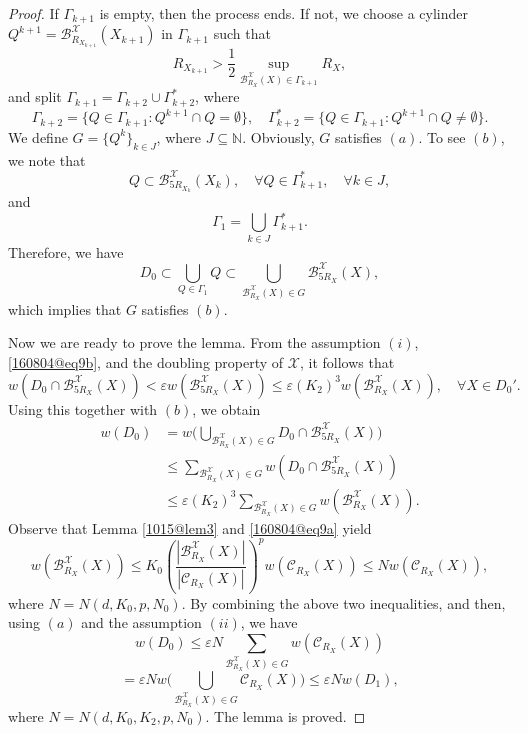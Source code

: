 \documentclass[reqno]{amsart}
\numberwithin{equation}{section}
\theoremstyle{plain}
\theoremstyle{definition}
\theoremstyle{remark}
\begin{document}
\begin{proof}
If $\Gamma_{k+1}$ is empty, then the process ends.
If not,  we choose a cylinder $Q^{k+1}={\mathcal{B}}^{\mathcal{X}}_{R_{X_{k+1}}}(X_{k+1})$ in $\Gamma_{k+1}$ such that 
$$
R_{X_{k+1}}>\frac{1}{2}\sup_{{\mathcal{B}}_{R_X}^{\mathcal{X}}(X)\in \Gamma_{k+1}}R_X,
$$
and split $\Gamma_{k+1}=\Gamma_{k+2}\cup \Gamma_{k+2}^*$, where
$$
\Gamma_{k+2}=\{Q\in \Gamma_{k+1}: Q^{k+1}\cap Q=\emptyset\}, \quad \Gamma_{k+2}^*=\{Q\in \Gamma_{k+1}:Q^{k+1}\cap Q\neq \emptyset\}.
$$
We define $G=\{Q^k\}_{k\in J}$, where $J\subseteq {\mathbb{N}}$.
Obviously, $G$ satisfies $(a)$.
To see $(b)$, we note that 
$$
Q\subset {\mathcal{B}}^{\mathcal{X}}_{5R_{X_{k}}}(X_k), \quad \forall Q\in \Gamma_{k+1}^*, \quad \forall k\in J,
$$
and 
$$
\Gamma_1=\bigcup_{k\in J}\Gamma_{k+1}^*.
$$
Therefore, we have 
$$
D_0\subset \bigcup_{Q\in \Gamma_1} Q\subset \bigcup_{{\mathcal{B}}^{\mathcal{X}}_{R_X}(X)\in G}{\mathcal{B}}_{5R_X}^{\mathcal{X}}(X),
$$
which implies that $G$ satisfies $(b)$.

Now we are ready to prove the lemma.
From the assumption $(i)$, \eqref{160804@eq9b}, and the doubling property of ${\mathcal{X}}$, it follows that  
$$
w(D_0\cap {\mathcal{B}}_{5R_X}^{\mathcal{X}}(X))<\varepsilon w({\mathcal{B}}_{5R_X}^{\mathcal{X}}(X))\le \varepsilon (K_2)^3w({\mathcal{B}}^{\mathcal{X}}_{R_X}(X)), \quad \forall X\in D_0'.
$$
Using this together with $(b)$, we obtain 
\begin{align*}
w(D_0)&=w\Biggl(\bigcup_{{\mathcal{B}}^{\mathcal{X}}_{R_X}(X)\in G}D_0\cap {\mathcal{B}}_{5R_X}^{\mathcal{X}}(X)\Biggr)\\
&\le \sum_{{\mathcal{B}}_{R_X}^{\mathcal{X}}(X)\in G}w(D_0\cap {\mathcal{B}}_{5R_X}^{\mathcal{X}}(X))\\
&\le \varepsilon (K_2)^3\sum_{{\mathcal{B}}_{R_X}^{\mathcal{X}}(X)\in G} w({\mathcal{B}}_{R_X}^{\mathcal{X}}(X)).
\end{align*}
Observe that Lemma \ref{1015@lem3} and \eqref{160804@eq9a} yield
$$
w({\mathcal{B}}_{R_X}^{\mathcal{X}}(X))\le K_0\left(\frac{|{\mathcal{B}}_{R_X}^{\mathcal{X}}(X)|}{|{\mathcal{C}}_{R_X}(X)|}\right)^pw({\mathcal{C}}_{R_X}(X))\le N w({\mathcal{C}}_{R_X}(X)),
$$
where $N=N(d,K_0,p,N_0)$.
By combining the above two inequalities, and then, using $(a)$ and the assumption $(ii)$, we have 
$$
w(D_0)\le \varepsilon N\sum_{{\mathcal{B}}_{R_X}^{\mathcal{X}}(X)\in G}w({\mathcal{C}}_{R_X}(X))
$$
$$
=\varepsilon Nw\Biggl(\bigcup_{{\mathcal{B}}^{\mathcal{X}}_{R_X}(X)\in G}{\mathcal{C}}_{R_X}(X)\Biggr)\le \varepsilon N w(D_1),
$$
where $N=N(d,K_0,K_2,p,N_0)$.
The lemma is proved.
\end{proof}
\end{document}
